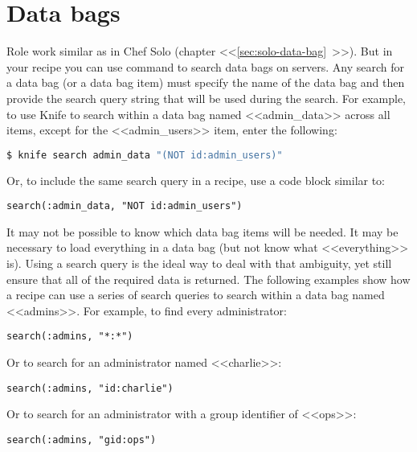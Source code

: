 \section{Data bags}

Role work similar as in Chef Solo (chapter <<\ref{sec:solo-data-bag}~>>). But in your recipe you can use  command to search data bags on servers. Any search for a data bag (or a data bag item) must specify the name of the data bag and then provide the search query string that will be used during the search. For example, to use Knife to search within a data bag named <<admin\_data>> across all items, except for the <<admin\_users>> item, enter the following:

\begin{lstlisting}[language=Bash,label=lst:my-server-cloud-databag1]
$ knife search admin_data "(NOT id:admin_users)"
\end{lstlisting}

Or, to include the same search query in a recipe, use a code block similar to:

\begin{lstlisting}[label=lst:my-server-cloud-databag2]
search(:admin_data, "NOT id:admin_users")
\end{lstlisting}

It may not be possible to know which data bag items will be needed. It may be necessary to load everything in a data bag (but not know what <<everything>> is). Using a search query is the ideal way to deal with that ambiguity, yet still ensure that all of the required data is returned. The following examples show how a recipe can use a series of search queries to search within a data bag named <<admins>>. For example, to find every administrator:

\begin{lstlisting}[label=lst:my-server-cloud-databag3]
search(:admins, "*:*")
\end{lstlisting}

Or to search for an administrator named <<charlie>>:

\begin{lstlisting}[label=lst:my-server-cloud-databag4]
search(:admins, "id:charlie")
\end{lstlisting}

Or to search for an administrator with a group identifier of <<ops>>:

\begin{lstlisting}[label=lst:my-server-cloud-databag5]
search(:admins, "gid:ops")
\end{lstlisting}

